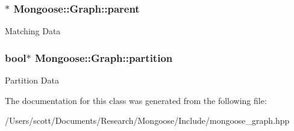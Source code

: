 \subsubsection[{\texorpdfstring{parent}{parent}}]{$\ast$ Mongoose\+::\+Graph\+::parent}\hypertarget{class_mongoose_1_1_graph_ae3fa91e7453224cdf98cc3088becaba4}{}\label{class_mongoose_1_1_graph_ae3fa91e7453224cdf98cc3088becaba4}
Matching Data 
\subsubsection[{\texorpdfstring{partition}{partition}}]{\setlength{\rightskip}{0pt plus 5cm}bool$\ast$ Mongoose\+::\+Graph\+::partition}\hypertarget{class_mongoose_1_1_graph_a6f77274bc866a3b61da35f7e2ceb520e}{}\label{class_mongoose_1_1_graph_a6f77274bc866a3b61da35f7e2ceb520e}
Partition Data 

The documentation for this class was generated from the following file\+:\begin{DoxyCompactItemize}
\item 
/\+Users/scott/\+Documents/\+Research/\+Mongoose/\+Include/mongoose\+\_\+graph.\+hpp\end{DoxyCompactItemize}
